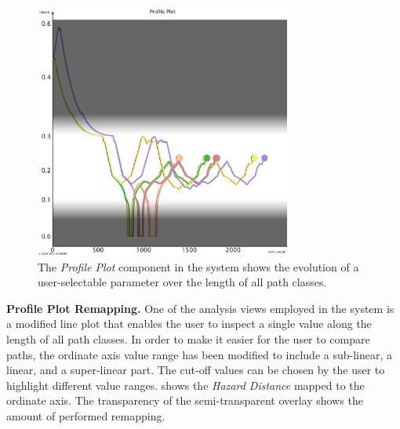 \begin{figure}
\centering
\includegraphics[width=0.75\textwidth]{figures/contributions/usar/profile_plot.png}
\caption{The \emph{Profile Plot} component in the system shows the evolution of a user-selectable parameter over the length of all path classes.}
\label{contributions:usar:rendering:profile}
\end{figure}

\textbf{Profile Plot Remapping.}  One of the analysis views employed in the system is a modified line plot that enables the user to inspect a single value along the length of all path classes.  In order to make it easier for the user to compare paths, the ordinate axis value range has been modified to include a sub-linear, a linear, and a super-linear part.  The cut-off values can be chosen by the user to highlight different value ranges.   shows the \emph{Hazard Distance} mapped to the ordinate axis.  The transparency of the semi-transparent overlay shows the amount of performed remapping.

